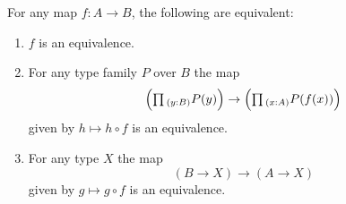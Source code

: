 \begin{thm}\label{ex:equiv_precomp}
For any map $f:A\to B$, the following are equivalent:
\begin{enumerate}
\item $f$ is an equivalence.
\item For any type family $P$ over $B$ the map
\begin{equation*}
\Big(\prd{y:B}P(y)\Big)\to\Big(\prd{x:A}P(f(x))\Big)
\end{equation*}
given by $h\mapsto h\circ f$ is an equivalence.
\item For any type $X$ the map
\begin{equation*}
(B\to X)\to (A\to X)
\end{equation*}
given by $g\mapsto g\circ f$ is an equivalence. 
\end{enumerate}
\end{thm}

